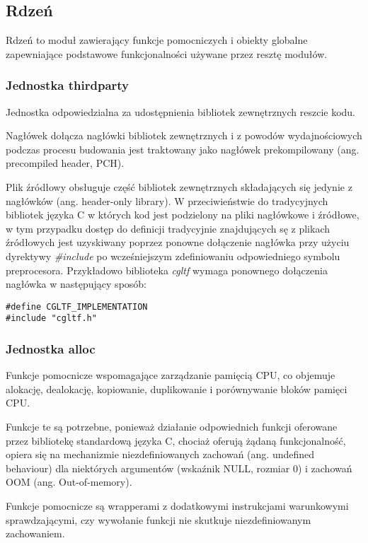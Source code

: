 \subsection{Rdzeń}

Rdzeń to moduł zawierający funkcje pomocniczych i obiekty globalne zapewniające podstawowe funkcjonalności używane przez resztę modułów.

\subsubsection{Jednostka thirdparty}
Jednostka odpowiedzialna za udostępnienia bibliotek zewnętrznych reszcie kodu.

Nagłówek dołącza nagłówki bibliotek zewnętrznych i z powodów wydajnościowych podczas procesu budowania jest traktowany jako nagłówek prekompilowany (ang. precompiled header, PCH).

Plik źródłowy obsługuje część bibliotek zewnętrznych składających się jedynie z nagłówków (ang. header-only library).
W przeciwieństwie do tradycyjnych bibliotek języka C w których kod jest podzielony na pliki nagłówkowe i źródłowe, w tym przypadku dostęp do definicji tradycyjnie znajdujących sę z plikach źródłowych jest uzyskiwany poprzez ponowne dołączenie nagłówka przy użyciu dyrektywy \textit{\#include} po wcześniejszym zdefiniowaniu odpowiedniego symbolu preprocesora.
Przykładowo biblioteka \textit{cgltf} wymaga ponownego dołączenia nagłówka w następujący sposób:
\lstset{language=C}
\begin{lstlisting}
#define CGLTF_IMPLEMENTATION
#include "cgltf.h"
\end{lstlisting}

\subsubsection{Jednostka alloc}
Funkcje pomocnicze wspomagające zarządzanie pamięcią CPU, co objemuje alokację, dealokację, kopiowanie, duplikowanie i porównywanie bloków pamięci CPU.

Funkcje te są potrzebne, ponieważ działanie odpowiednich funkcji oferowane przez bibliotekę standardową języka C, chociaż oferują żądaną funkcjonalność, opiera się na mechanizmie niezdefiniowanych zachowań (ang. undefined behaviour) dla niektórych argumentów (wskaźnik NULL, rozmiar 0) i zachowań OOM (ang. Out-of-memory).

Funkcje pomocnicze są wrapperami z dodatkowymi instrukcjami warunkowymi sprawdzającymi, czy wywołanie funkcji nie skutkuje niezdefiniowanym zachowaniem.

